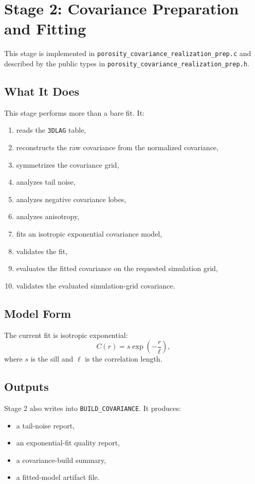 \documentclass[11pt]{article}
\begin{document}
\section{Stage 2: Covariance Preparation and Fitting}
This stage is implemented in \texttt{porosity\_covariance\_realization\_prep.c}
and described by the public types in
\texttt{porosity\_covariance\_realization\_prep.h}.

\subsection{What It Does}
This stage performs more than a bare fit. It:
\begin{enumerate}[label=\arabic*.]
\item reads the \texttt{3DLAG} table,
\item reconstructs the raw covariance from the normalized covariance,
\item symmetrizes the covariance grid,
\item analyzes tail noise,
\item analyzes negative covariance lobes,
\item analyzes anisotropy,
\item fits an isotropic exponential covariance model,
\item validates the fit,
\item evaluates the fitted covariance on the requested simulation grid,
\item validates the evaluated simulation-grid covariance.
\end{enumerate}

\subsection{Model Form}
The current fit is isotropic exponential:
\[
C(r) = s \exp\left(-\frac{r}{\ell}\right),
\]
where \(s\) is the sill and \(\ell\) is the correlation length.

\subsection{Outputs}
Stage 2 also writes into \texttt{BUILD\_COVARIANCE}. It produces:
\begin{itemize}
\item a tail-noise report,
\item an exponential-fit quality report,
\item a covariance-build summary,
\item a fitted-model artifact file.
\end{itemize}
\end{document}
